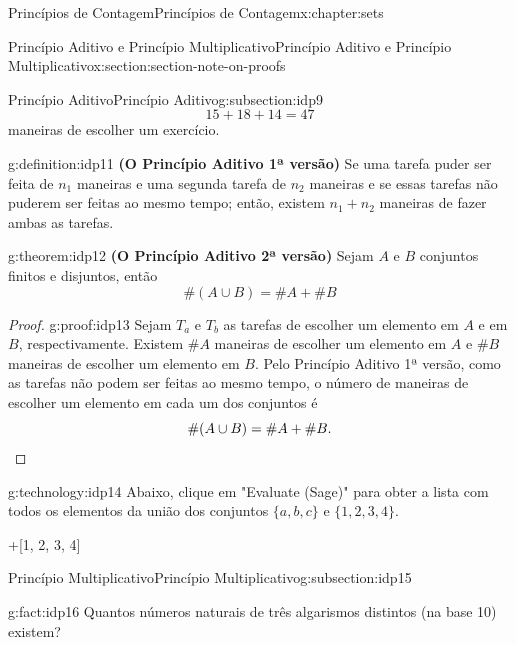 \documentclass[oneside,10pt,]{book}
\newcommand{\terminology}[1]{\textbf{#1}}
\newcommand{\qedhere}{\relax}
\numberwithin{equation}{section}
\begin{document}
\begin{chapterptx}{Princípios de Contagem}{}{Princípios de Contagem}{}{}{x:chapter:sets}
\begin{sectionptx}{Princípio Aditivo e Princípio Multiplicativo}{}{Princípio Aditivo e Princípio Multiplicativo}{}{}{x:section:section-note-on-proofs}
\begin{subsectionptx}{Princípio Aditivo}{}{Princípio Aditivo}{}{}{g:subsection:idp9}
\begin{equation*}
15+18+14 = 47
\end{equation*}
maneiras de escolher um exercício.%
\begin{definition}{}{g:definition:idp11}%
\terminology{(O Princípio Aditivo 1ª versão)} Se uma tarefa puder ser feita de \(n_1\) maneiras e uma segunda tarefa de \(n_2\) maneiras e se essas tarefas não puderem ser feitas ao mesmo tempo; então, existem \(n_1+n_2\) maneiras de fazer ambas as tarefas.%
\end{definition}
\begin{theorem}{}{}{g:theorem:idp12}%
\terminology{(O Princípio Aditivo 2ª versão)} Sejam \(A\) e \(B\) conjuntos finitos e disjuntos, então%
\begin{equation*}
\#(A\cup B)=\#A+ \#B
\end{equation*}
%
\end{theorem}
\begin{proof}{}{g:proof:idp13}
Sejam \(T_a\) e \(T_b\) as tarefas de escolher um elemento em \(A\) e em \(B\), respectivamente. Existem \(\#A\) maneiras de escolher um elemento em \(A\) e \(\#B\) maneiras de escolher um elemento em \(B\). Pelo Princípio Aditivo 1ª versão, como as tarefas não podem ser feitas ao mesmo tempo, o número de maneiras de escolher um elemento em cada um dos conjuntos é%
\begin{equation*}
\#(A\cup B)=\#A+ \#B.\qedhere
\end{equation*}
%
\end{proof}
\begin{technology}{}{g:technology:idp14}%
Abaixo, clique em "Evaluate (Sage)" para obter a lista com todos os elementos da união dos conjuntos \(\{a, b, c\}\) e \(\{1, 2, 3, 4\}\).%
\begin{sageinput}
['a', 'b', 'c']+[1, 2, 3, 4]
\end{sageinput}
\begin{sageoutput}
['a', 'b', 'c', 1, 2, 3, 4]
\end{sageoutput}
\end{technology}
\end{subsectionptx}
%
%
\typeout{************************************************}
\typeout{************************************************}
%
\begin{subsectionptx}{Princípio Multiplicativo}{}{Princípio Multiplicativo}{}{}{g:subsection:idp15}
\begin{fact}{}{}{g:fact:idp16}%
Quantos números naturais de três algarismos distintos (na base 10) existem?%

\end{fact}
\end{subsectionptx}
\end{sectionptx}
\end{chapterptx}
\end{document}
